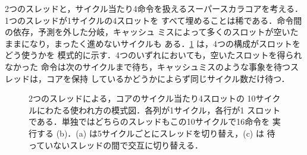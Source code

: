 \documentclass[../main.tex]{subfiles}
\begin{document}
2つのスレッドと，サイクル当たり4命令を扱えるスーパースカラコアを考える．
1つのスレッドが1サイクルの4スロットを
すべて埋めることは稀である．命令間の依存，予測を外した分岐，キャッシュ
ミスによって多くのスロットが空いたままになり，まったく進めないサイクルも
ある．\cref{fig:l18-mt-timing} は，4つの構成がスロットをどう使うかを
模式的に示す．4つのいずれにおいても，空いたスロットを得られなかった
命令は次のサイクルまで待ち，キャッシュミスのような事象を待つスレッドは，コアを保持
しているかどうかによらず同じサイクル数だけ待つ．

\begin{figure}[htbp]
  \centering
  
  \caption{2つのスレッドによる，コアのサイクル当たり4スロットの
    10サイクルにわたる使われ方の模式図．各列が1サイクル，各行が1
    スロットである．単独ではどちらのスレッドもこの10サイクルで16命令を
    実行する (b)．(a) は5サイクルごとにスレッドを切り替え，(c) は
    待っていないスレッドの間で交互に切り替える．}
  \label{fig:l18-mt-timing}
\end{figure}
\end{document}
